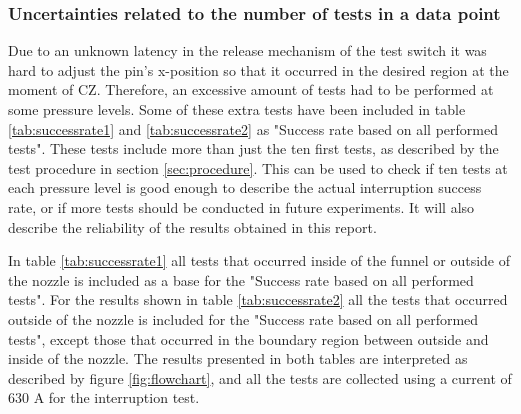 \documentclass[10pt,b5paper,twoside]{article}
\begin{document}
\subsubsection{Uncertainties related to the number of tests in a data point} \label{sec:impactOfTestNumber}
Due to an unknown latency in the release mechanism of the test switch it was hard to adjust the pin's x-position so that it occurred in the desired region at the moment of CZ. Therefore, an excessive amount of tests had to be performed at some pressure levels. Some of these extra tests have been included in table \ref{tab:successrate1} and \ref{tab:successrate2} as "Success rate based on all performed tests". These tests include more than just the ten first tests, as described by the test procedure in section \ref{sec:procedure}. This can be used to check if ten tests at each pressure level is good enough to describe the actual interruption success rate, or if more tests should be conducted in future experiments. It will also describe the reliability of the results obtained in this report.

In table \ref{tab:successrate1} all tests that occurred inside of the funnel or outside of the nozzle is included as a base for the "Success rate based on all performed tests". For the results shown in table \ref{tab:successrate2} all the tests that occurred outside of the nozzle is included for the "Success rate based on all performed tests", except those that occurred in the boundary region between outside and inside of the nozzle. The results presented in both tables are interpreted as described by figure \ref{fig:flowchart}, and all the tests are collected using a current of 630 A for the interruption test. 
\end{document}
